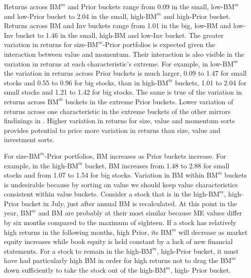 Returns across $\text{BM}^m$ and Prior buckets range from 0.09 in the small,
low-$\text{BM}^m$ and low-Prior bucket to 2.04 in the small, high-$\text{BM}^m$
and high-Prior bucket.
Returns across BM and Inv buckets range from 1.01 in the big, low-BM and
low-Inv bucket to 1.46 in the small, high-BM and low-Inv bucket. 
The greater variation in returns for size-$\text{BM}^m$-Prior
portfolios is expected given the interaction between value and momentum.
Their interaction is also visible in the variation in returns at each
characteristic's extreme.
For example, in low-$\text{BM}^m$ the variation in returns across Prior buckets
is much larger, 0.09 to 1.47 for small stocks and 0.55 to 0.96 for big stocks,
than in high-$\text{BM}^m$ buckets, 1.01 to 2.04 for small stocks and 1.21 to
1.42 for big stocks.
The same is true of the variation in returns across $\text{BM}^m$ buckets in
the extreme Prior buckets.
Lower variation of returns across one characteristic in the extreme buckets of
the other mirrors findinings in \textcite{asness2013devil}.
Higher variation in returns for size, value and momentum sorts provides
potential to price more variation in returns than size, value and investment sorts.

For size-$\text{BM}^m$-Prior portfolios, BM increases as Prior buckets increase.
For example, in the high-$\text{BM}^m$ bucket, BM increases from 1.48 to 2.88
for small stocks and from 1.07 to 1.54 for big stocks.
Variation in BM within $\text{BM}^m$ buckets is undesirable because by sorting
on value we should keep value characteristics consistent within value buckets.
Consider a stock that is in the high-$\text{BM}^m$, high-Prior bucket in July,
just after annual BM is recalculated.
At this point in the year, $\text{BM}^m$ and BM are probably at their most
similar because ME values differ by six months compared to the maximum of eighteen.
If a stock has relatively high returns in the following months, high Prior,
its $\text{BM}^m$ will decrease as market equity increases while book equity
is held constant by a lack of new financial statements.
For a stock to remain in the high-$\text{BM}^m$, high-Prior bucket,
it must have had particularly high BM in order for high returns not to drag the
$\text{BM}^m$ down sufficiently to take the stock out of the
high-$\text{BM}^m$, high- Prior bucket.

